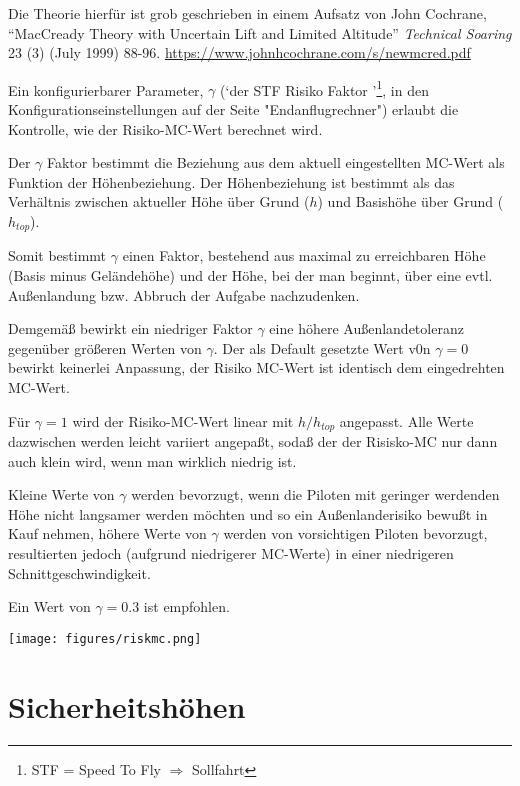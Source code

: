 Die Theorie hierfür ist grob geschrieben in einem Aufsatz von John
  Cochrane, ``MacCready Theory with Uncertain Lift and Limited
  Altitude'' {\em Technical Soaring} 23 (3) (July 1999) 88-96.
  \url{https://www.johnhcochrane.com/s/newmcred.pdf}


Ein konfigurierbarer Parameter, $\gamma$ (`der STF Risiko Faktor '\footnote{STF  = Speed To Fly $\Rightarrow$  Sollfahrt},
in den Konfigurationseinstellungen auf der Seite "Endanflugrechner") erlaubt die Kontrolle, wie der Risiko-MC-Wert berechnet wird.

Der $\gamma$ Faktor bestimmt die Beziehung aus dem aktuell eingestellten MC-Wert als Funktion der Höhenbeziehung.
Der Höhenbeziehung ist bestimmt als das Verhältnis zwischen aktueller Höhe über Grund ($h$) und Basishöhe über Grund ($h_{top}$).

Somit bestimmt $\gamma$ einen Faktor, bestehend aus maximal zu erreichbaren Höhe (Basis minus Geländehöhe)
und der Höhe, bei der man beginnt, über eine evtl. Außenlandung bzw. Abbruch der Aufgabe nachzudenken.

Demgemäß bewirkt ein niedriger Faktor $\gamma$ eine höhere Außenlandetoleranz gegenüber größeren Werten von $\gamma$. Der als Default
gesetzte Wert v0n $\gamma=0$ bewirkt keinerlei  Anpassung, der Risiko MC-Wert ist identisch dem eingedrehten MC-Wert.

Für $\gamma=1$ wird der Risiko-MC-Wert linear mit $h/h_{top}$ angepasst.
Alle Werte dazwischen werden leicht variiert angepaßt, sodaß der der Risisko-MC nur dann auch klein wird, wenn man wirklich niedrig ist.

Kleine Werte von $\gamma$ werden bevorzugt, wenn die Piloten mit geringer werdenden Höhe nicht langsamer werden möchten und so ein
Außenlanderisiko bewußt in Kauf nehmen, höhere Werte von $\gamma$ werden von vorsichtigen Piloten bevorzugt,
resultierten jedoch (aufgrund niedrigerer MC-Werte) in einer niedrigeren Schnittgeschwindigkeit.

Ein Wert von  $\gamma=0.3$ ist empfohlen.

\begin{center}
\texttt{[image: figures/riskmc.png]}
\end{center}

\section{Sicherheitshöhen}\label{sec:safety-heights}

